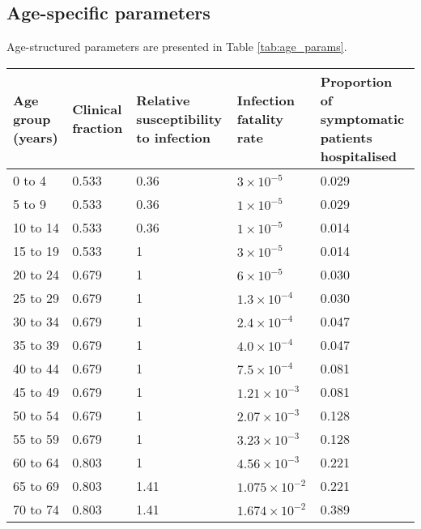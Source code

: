 \subsection{Age-specific parameters}
Age-structured parameters are presented in Table \ref{tab:age_params}.

\begin{table}
    \begin{threeparttable}
    \begin{tabularx}{\textwidth}{| X | X | X | X | X |}
        \hline
        Age group (years) & Clinical fraction\tnote{a} & 
        Relative susceptibility to infection & Infection fatality rate & 
        Proportion of symptomatic patients hospitalised \\
        \hline
        0 to 4 & 0.533 & 0.36 & $3\times10^{-5}$ & 0.029 \\
        \hline
        5 to 9 & 0.533 & 0.36 & $1\times10^{-5}$ & 0.029 \\
        \hline
        10 to 14 & 0.533 & 0.36 & $1\times10^{-5}$ & 0.014 \\
        \hline
        15 to 19 & 0.533 & 1 & $3\times10^{-5}$ & 0.014 \\
        \hline
        20 to 24 & 0.679 & 1 & $6\times10^{-5}$ & 0.030 \\
        \hline
        25 to 29 & 0.679 & 1 & $1.3\times10^{-4}$ & 0.030 \\
        \hline
        30 to 34 & 0.679 & 1 & $2.4\times10^{-4}$ & 0.047 \\
        \hline
        35 to 39 & 0.679 & 1 & $4.0\times10^{-4}$ & 0.047 \\
        \hline
        40 to 44 & 0.679 & 1 & $7.5\times10^{-4}$ & 0.081 \\
        \hline
        45 to 49 & 0.679 & 1 & $1.21\times10^{-3}$ & 0.081 \\
        \hline
        50 to 54 & 0.679 & 1 & $2.07\times10^{-3}$ & 0.128 \\
        \hline
        55 to 59 & 0.679 & 1 & $3.23\times10^{-3}$ & 0.128 \\
        \hline
        60 to 64 & 0.803 & 1 & $4.56\times10^{-3}$ & 0.221 \\
        \hline
        65 to 69 & 0.803 & 1.41 & $1.075\times10^{-2}$ & 0.221 \\
        \hline
        70 to 74 & 0.803 & 1.41 & $1.674\times10^{-2}$ & 0.389 \\

\end{tabularx}
\end{threeparttable}
\end{table}
